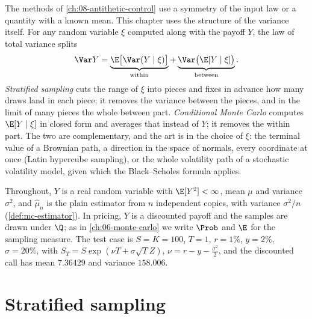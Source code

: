 
The methods of \cref{ch:08-antithetic-control} use a symmetry of the input law or a
quantity with a known mean. This chapter uses the structure of the variance itself. For any
random variable $\xi$ computed along with the payoff $Y$, the law of total variance splits
\begin{equation}\label{eq:st-total-variance}
  \Var Y=\underbrace{\E\big[\Var(Y\mid\xi)\big]}_{\text{within}}+\underbrace{\Var\big(\E[Y\mid\xi]\big)}_{\text{between}} .
\end{equation}
\emph{Stratified sampling} cuts the range of $\xi$ into pieces and fixes in advance how
many draws land in each piece; it removes the variance between the pieces, and in the limit
of many pieces the whole between part. \emph{Conditional Monte Carlo} computes $\E[Y\mid\xi]$ in closed form and
averages that instead of $Y$; it removes the within part. The two are complementary, and
the art is in the choice of $\xi$: the terminal value of a Brownian path, a direction in the
space of normals, every coordinate at once (Latin hypercube sampling), or the whole
volatility path of a stochastic volatility model, given which the Black--Scholes formula
applies.

Throughout, $Y$ is a real random variable with $\E[Y^2]<\infty$, mean $\mu$ and variance
$\sigma^2$, and $\hat\mu_n$ is the plain estimator from $n$ independent copies, with
variance $\sigma^2/n$ (\cref{def:mc-estimator}). In pricing, $Y$ is a discounted payoff and
the samples are drawn under $\Q$; as in \cref{ch:06-monte-carlo} we write $\Prob$ and $\E$
for the sampling measure. The test case is $S=K=100$, $T=1$, $r=1\%$, $y=2\%$,
$\sigma=20\%$, with $S_T=S\exp(\nu T+\sigma\sqrt T Z)$, $\nu=r-y-\frac{\sigma^2}2$, and the
discounted call has mean $7.36429$ and variance $158.006$.

\section{Stratified sampling}\label{sec:st-strata}


